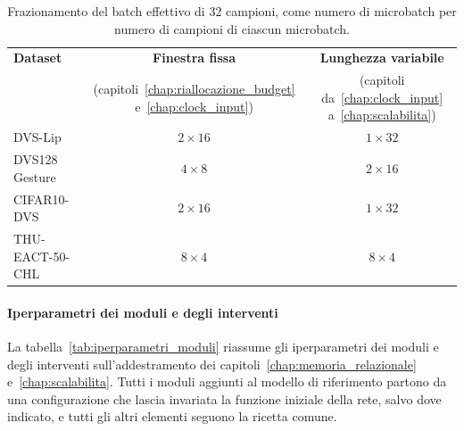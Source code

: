 \begin{table}[ht]
\centering
\small
\renewcommand{\arraystretch}{1.2}
\caption[Frazionamento del batch]{Frazionamento del batch effettivo di 32 campioni, come numero di microbatch per numero di campioni di ciascun microbatch.}
\label{tab:microbatch}
\begin{tabular}{@{}l c c@{}}
\hline
\textbf{Dataset} & \textbf{Finestra fissa} & \textbf{Lunghezza variabile} \\
 & {\footnotesize(capitoli~\ref{chap:riallocazione_budget} e~\ref{chap:clock_input})} & {\footnotesize(capitoli da~\ref{chap:clock_input} a~\ref{chap:scalabilita})} \\
\hline
DVS-Lip & $2\times16$ & $1\times32$ \\
DVS128 Gesture & $4\times8$ & $2\times16$ \\
CIFAR10-DVS & $2\times16$ & $1\times32$ \\
THU-EACT-50-CHL & $8\times4$ & $8\times4$ \\
\hline
\end{tabular}
\end{table}

\paragraph{Iperparametri dei moduli e degli interventi}
La tabella~\ref{tab:iperparametri_moduli} riassume gli iperparametri dei moduli e degli interventi sull'addestramento dei capitoli~\ref{chap:memoria_relazionale} e~\ref{chap:scalabilita}. Tutti i moduli aggiunti al modello di riferimento partono da una configurazione che lascia invariata la funzione iniziale della rete, salvo dove indicato, e tutti gli altri elementi seguono la ricetta comune.

